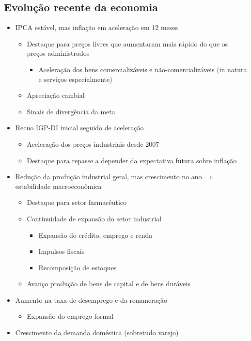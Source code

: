 \documentclass[11pt]{article}
\begin{document}
\subsection*{Evolução recente da economia}
\label{sec:orge9602cb}
\begin{itemize}
\item IPCA estável, mas inflação em aceleração em 12 meses
\begin{itemize}
\item Destaque para preços livres que aumentaram mais rápido do que os preços administrados
\begin{itemize}
\item Aceleração dos bens comercializáveis e não-comercializáveis (in natura e serviços especialmente)
\end{itemize}
\item Apreciação cambial
\item Sinais de divergência da meta
\end{itemize}
\item Recuo IGP-DI inicial seguido de aceleração
\begin{itemize}
\item Aceleração dos preços industriais desde 2007
\item Destaque para repasse a depender da expectativa futura sobre inflação
\end{itemize}
\item Redução da produção industrial geral, mas crescimento no ano \(\Rightarrow\) estabilidade macroeconômica
\begin{itemize}
\item Destaque para setor farmacêutico
\item Continuidade de expansão do setor industrial
\begin{itemize}
\item Expansão do crédito, emprego e renda
\item Impulsos fiscais
\item Recomposição de estoques
\end{itemize}
\item Avanço produção de bens de capital e de bens duráveis
\end{itemize}
\item Aumento na taxa de desemprego e da remuneração
\begin{itemize}
\item Expansão do emprego formal
\end{itemize}
\item Crescimento da demanda doméstica (sobretudo varejo)

\end{itemize}
\end{document}
